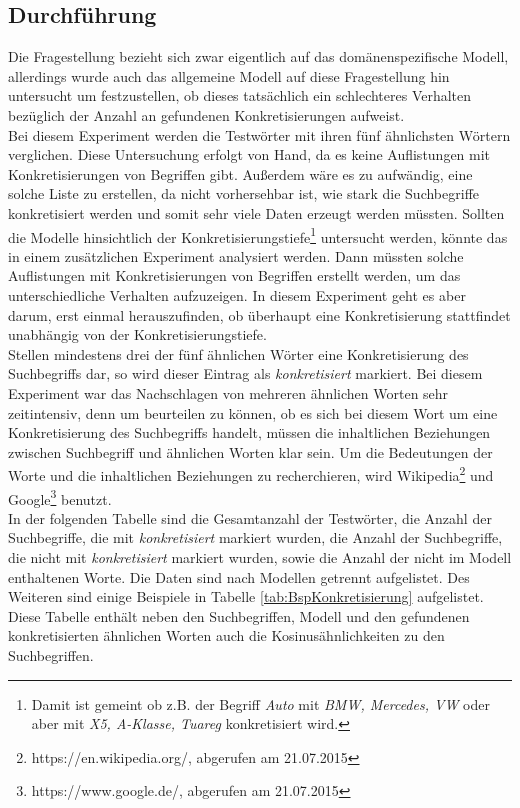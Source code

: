 \documentclass[12pt,a4paper]{report}
\begin{document}
		\subsection*{Durchführung}
		Die Fragestellung bezieht sich zwar eigentlich auf das domänenspezifische Modell, allerdings wurde auch das allgemeine Modell auf diese Fragestellung hin untersucht um festzustellen, ob dieses tatsächlich ein schlechteres Verhalten bezüglich der Anzahl an gefundenen Konkretisierungen aufweist.\\
		Bei diesem Experiment werden die Testwörter mit ihren fünf ähnlichsten Wörtern verglichen. Diese Untersuchung erfolgt von Hand, da es keine Auflistungen mit Konkretisierungen von Begriffen gibt. Außerdem wäre es zu aufwändig, eine solche Liste zu erstellen, da nicht vorhersehbar ist, wie stark die Suchbegriffe konkretisiert werden und somit sehr viele Daten erzeugt werden müssten. Sollten die Modelle hinsichtlich der Konkretisierungstiefe\footnote{Damit ist gemeint ob z.B. der Begriff \textit{Auto} mit \textit{BMW, Mercedes, VW} oder aber mit \textit{X5, A-Klasse, Tuareg} konkretisiert wird.} untersucht werden, könnte das in einem zusätzlichen Experiment analysiert werden. Dann müssten solche Auflistungen mit Konkretisierungen von Begriffen erstellt werden, um das unterschiedliche Verhalten aufzuzeigen. In diesem Experiment geht es aber darum, erst einmal herauszufinden, ob überhaupt eine Konkretisierung stattfindet unabhängig von der Konkretisierungstiefe.\\	
		 Stellen mindestens drei der fünf ähnlichen Wörter eine Konkretisierung des Suchbegriffs dar, so wird dieser Eintrag als \textit{konkretisiert} markiert. Bei diesem Experiment war das Nachschlagen von mehreren ähnlichen Worten sehr zeitintensiv, denn um beurteilen zu können, ob es sich bei diesem Wort um eine Konkretisierung des Suchbegriffs handelt, müssen die inhaltlichen Beziehungen zwischen Suchbegriff und ähnlichen Worten klar sein. Um die Bedeutungen der Worte und die inhaltlichen Beziehungen zu recherchieren, wird Wikipedia\footnote{https://en.wikipedia.org/, abgerufen am 21.07.2015} und Google\footnote{https://www.google.de/, abgerufen am 21.07.2015} benutzt.\\
		
		In der folgenden Tabelle sind die Gesamtanzahl der Testwörter, die Anzahl der Suchbegriffe, die mit \textit{konkretisiert} markiert wurden, die Anzahl der Suchbegriffe,  die nicht mit \textit{konkretisiert} markiert wurden, sowie die Anzahl der nicht im Modell enthaltenen Worte. Die Daten sind nach Modellen getrennt aufgelistet. Des Weiteren sind einige Beispiele in Tabelle \ref{tab:BspKonkretisierung} aufgelistet. Diese Tabelle enthält neben den Suchbegriffen, Modell und den gefundenen konkretisierten ähnlichen Worten auch die Kosinusähnlichkeiten zu den Suchbegriffen.
		
\end{document}
